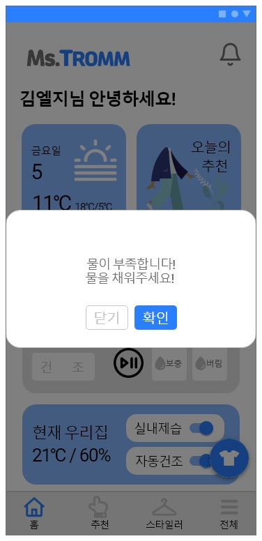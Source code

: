 \documentclass[conference]{IEEEtran}
\begin{document}
\begin{enumerate}
\centerline{\includegraphics[scale=0.18]{assets/제어추천 팝업1.jpg}
}
\end{enumerate}
\end{document}
